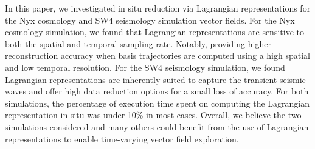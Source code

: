 In this paper, we investigated in situ reduction via Lagrangian representations for the Nyx cosmology and SW4 seismology simulation vector fields.
%
For the Nyx cosmology simulation, we found that Lagrangian representations are sensitive to both the spatial and temporal sampling rate.
%
Notably, providing higher reconstruction accuracy when basis trajectories are computed using a high spatial and low temporal resolution.
%
For the SW4 seismology simulation, we found Lagrangian representations are inherently suited to capture the transient seismic waves and offer high data reduction options for a small loss of accuracy.
%
For both simulations, the percentage of execution time spent on computing the Lagrangian representation in situ was under 10\% in most cases.
%
Overall, we believe the two simulations considered and many others could benefit from the use of Lagrangian representations to enable time-varying vector field exploration. 
